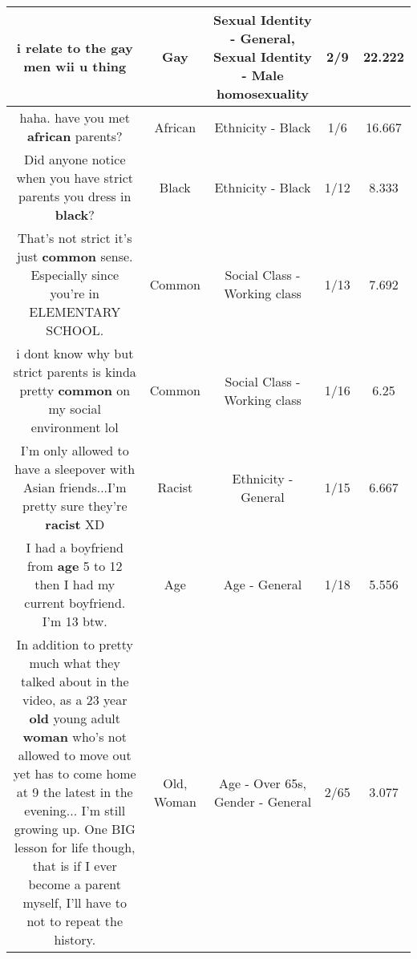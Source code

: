 \documentclass[11pt]{article}
\newlength\mylength
\begin{document}
\begin{center}
\begin{longtable}{|C{.65\mylength}|C{.30\mylength}|C{.12\mylength}|C{.12\mylength}|C{.12\mylength}|}
  \small i relate to the \textbf{g\textbf{ay}} men wii u thing\normalsize   & Gay & Sexual Identity - General, Sexual Identity - Male homosexuality & 2/9 & 22.222 \\  \hline
  \small haha. have you met \textbf{african} parents?\normalsize   & African & Ethnicity - Black & 1/6 & 16.667 \\  \hline
  \small Did anyone notice when you have strict parents you dress in \textbf{black}?\normalsize   & Black & Ethnicity - Black & 1/12 & 8.333 \\  \hline
  \small That's not strict it's just \textbf{common} sense. Especially since you're in ELEMENTARY SCHOOL.\normalsize   & Common & Social Class - Working class & 1/13 & 7.692 \\  \hline
  \small i dont know why but strict parents is kinda pretty \textbf{common} on my social environment lol\normalsize   & Common & Social Class - Working class & 1/16 & 6.25 \\  \hline
  \small I'm only allowed to have a sleepover with Asian friends...I'm pretty sure they're \textbf{racist} XD\normalsize   & Racist & Ethnicity - General & 1/15 & 6.667 \\  \hline
  \small I had a boyfriend from \textbf{age} 5 to 12 then I had my current boyfriend. I'm 13 btw.\normalsize   & Age & Age - General & 1/18 & 5.556 \\  \hline
  \small In addition to pretty much what they talked about in the video, as a 23 year \textbf{old} young adult \textbf{woman} who's not allowed to move out yet has to come home at 9 the latest in the evening... I'm still growing up. One BIG lesson for life though, that is if I ever become a parent myself, I'll have to not to repeat the history.\normalsize   & Old, Woman & Age - Over 65s, Gender - General & 2/65 & 3.077 \\  \hline

\end{longtable}
\end{center}
\end{document}
